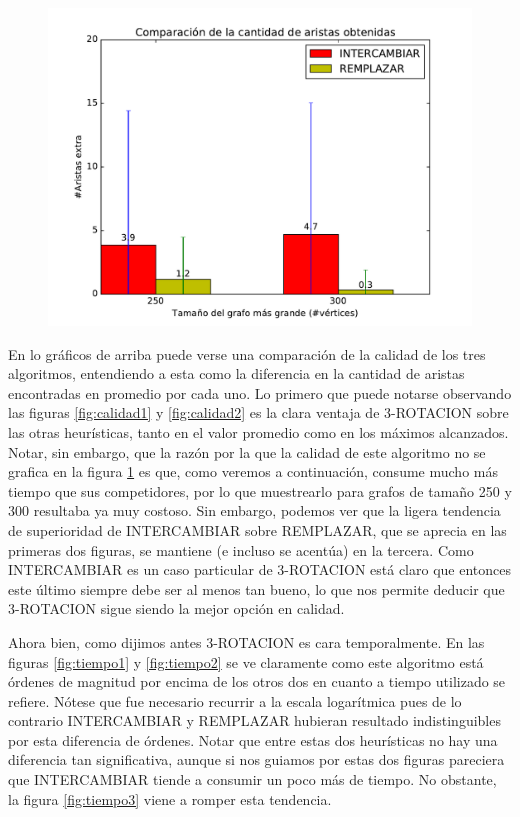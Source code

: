 \begin{figure}[H]
\begin{minipage}{0.49\textwidth}
  \centering
    \includegraphics[width=1\textwidth]{graficos/problema_5/calidad4.pdf}
  \caption{}
  \label{fig:calidad3}
\end{minipage}%
\end{figure}

En lo gráficos de arriba puede verse una comparación de la calidad de los tres algoritmos, entendiendo a esta como la diferencia en la cantidad de aristas encontradas en promedio por cada uno. Lo primero que puede notarse observando las figuras \ref{fig:calidad1} y \ref{fig:calidad2} es la clara ventaja de 3-ROTACION sobre las otras heurísticas, tanto en el valor promedio como en los máximos alcanzados. Notar, sin embargo, que la razón por la que la calidad de este algoritmo no se grafica en la figura \ref{fig:calidad3} es que, como veremos a continuación, consume mucho más tiempo que sus competidores, por lo que muestrearlo para grafos de tamaño 250 y 300 resultaba ya muy costoso. Sin embargo, podemos ver que la ligera tendencia de superioridad de INTERCAMBIAR sobre REMPLAZAR, que se aprecia  en las primeras dos figuras, se mantiene (e incluso se acentúa) en la tercera. Como INTERCAMBIAR es un caso particular de 3-ROTACION está claro que entonces este último siempre debe ser al menos tan bueno, lo que nos permite deducir que 3-ROTACION sigue siendo la mejor opción en calidad.

Ahora bien, como dijimos antes 3-ROTACION es cara temporalmente. En las figuras \ref{fig:tiempo1} y \ref{fig:tiempo2} se ve claramente como este algoritmo está órdenes de magnitud por encima de los otros dos en cuanto a tiempo utilizado se refiere. Nótese que fue necesario recurrir a la escala logarítmica pues de lo contrario INTERCAMBIAR y REMPLAZAR hubieran resultado indistinguibles por esta diferencia de órdenes.  Notar que entre estas dos heurísticas no hay una diferencia tan significativa, aunque si nos guiamos por estas dos figuras pareciera que INTERCAMBIAR tiende a consumir un poco más de tiempo. No obstante, la figura \ref{fig:tiempo3} viene a romper esta tendencia. 

